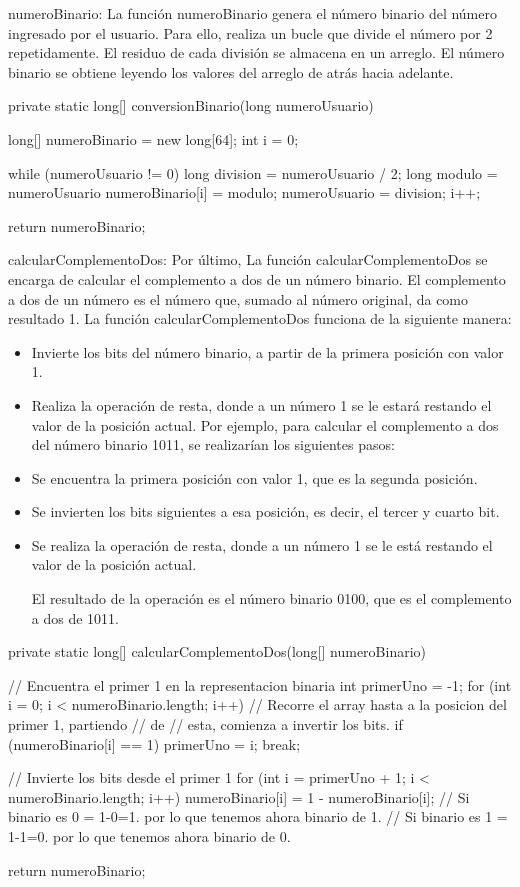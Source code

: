 \documentclass{IEEEcsmag}
\begin{document}
numeroBinario: La función numeroBinario genera el número binario del número ingresado por el usuario. Para ello, realiza un bucle que divide el número por 2 repetidamente. El residuo de cada división se almacena en un arreglo. El número binario se obtiene leyendo los valores del arreglo de atrás hacia adelante.

\begin{javaCode}
	private static long[] conversionBinario(long numeroUsuario) {
		long[] numeroBinario = new long[64];
		int i = 0;

		while (numeroUsuario != 0) {
			long division = numeroUsuario / 2;
			long modulo = numeroUsuario %
			numeroBinario[i] = modulo;
			numeroUsuario = division;
			i++;
		}

		return numeroBinario;
	}
\end{javaCode}

calcularComplementoDos: Por último, La función calcularComplementoDos se encarga de calcular el complemento a dos de un número binario. El complemento a dos de un número es el número que, sumado al número original, da como resultado 1.
La función calcularComplementoDos funciona de la siguiente manera:
\begin{itemize}
\item Invierte los bits del número binario, a partir de la primera posición con valor 1.
\item Realiza la operación de resta, donde a un número 1 se le estará restando el valor de la posición actual.
Por ejemplo, para calcular el complemento a dos del número binario 1011, se realizarían los siguientes pasos:
\item Se encuentra la primera posición con valor 1, que es la segunda posición.
\item Se invierten los bits siguientes a esa posición, es decir, el tercer y cuarto bit.
\item Se realiza la operación de resta, donde a un número 1 se le está restando el valor de la posición actual.

El resultado de la operación es el número binario 0100, que es el complemento a dos de 1011.
\end{itemize}

\begin{javaCode}
	private static long[] calcularComplementoDos(long[] numeroBinario) {
		// Encuentra el primer 1 en la representacion binaria
		int primerUno = -1;
		for (int i = 0; i < numeroBinario.length; i++) { // Recorre el array hasta a la posicion del primer 1, partiendo
															// de
			// esta, comienza a invertir los bits.
			if (numeroBinario[i] == 1) {
				primerUno = i;
				break;
			}
		}

		// Invierte los bits desde el primer 1
		for (int i = primerUno + 1; i < numeroBinario.length; i++) {
			numeroBinario[i] = 1 - numeroBinario[i]; // Si binario es 0 = 1-0=1. por lo que tenemos ahora binario de 1.
		} // Si binario es 1 = 1-1=0. por lo que tenemos ahora binario de 0.

		return numeroBinario;
	}
\end{javaCode}
\end{document}
